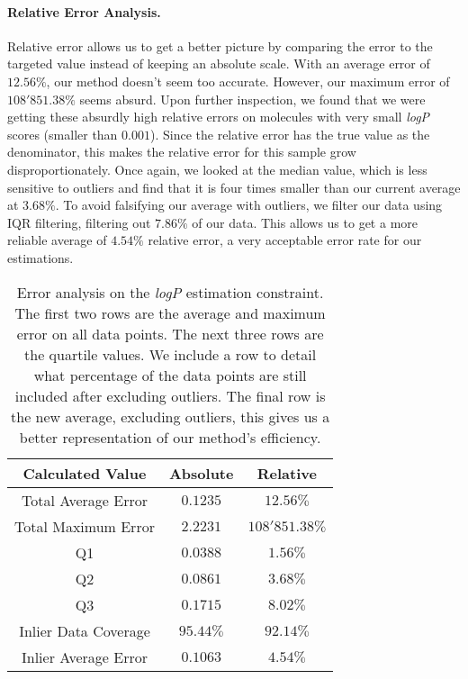 \documentclass[../Document.tex]{subfiles}
\begin{document}
\paragraph{Relative Error Analysis.} Relative error allows us to get a better picture by comparing the error to the targeted value instead of keeping an absolute scale. 
With an average error of $12.56\%$, our method doesn't seem too accurate.
However, our maximum error of $108'851.38\%$ seems absurd.
Upon further inspection, we found that we were getting these absurdly high relative errors on molecules with very small \emph{logP} scores (\ie smaller than $0.001$).
Since the relative error has the true value as the denominator, this makes the relative error for this sample grow disproportionately.
Once again, we looked at the median value, which is less sensitive to outliers and find that it is four times smaller than our current average at $3.68\%$.
To avoid falsifying our average with outliers, we filter our data using IQR filtering, filtering out $7.86\%$ of our data.
This allows us to get a more reliable average of $4.54\%$ relative error, a very acceptable error rate for our estimations.

\begin{table}[H]
    \centering
    \begin{tabular}{|c|c|c|}
        \hline
        Calculated Value & Absolute & Relative\\
        \hline
        Total Average Error & $0.1235$ & $12.56\%$\\
        \hline
        Total Maximum Error & $2.2231$ & $108'851.38\%$\\
        \hline
        Q1 & $0.0388$ & $1.56\%$\\
        \hline
        Q2 & $0.0861$ & $3.68\%$\\
        \hline
        Q3 & $0.1715$ & $8.02\%$\\
        \hline
        Inlier Data Coverage & $95.44\%$ & $92.14\%$\\
        \hline
        Inlier Average Error & $0.1063$ & $4.54\%$\\
        \hline
    \end{tabular}
    \caption[Error analysis on the \emph{logP} estimation constraint]{Error analysis on the \emph{logP} estimation constraint. The first two rows are the average and maximum error on all data points. The next three rows are the quartile values. We include a row to detail what percentage of the data points are still included after excluding outliers. The final row is the new average, excluding outliers, this gives us a better representation of our method's efficiency.}
    \label{tab:lingo-error-analysis}
\end{table}
\end{document}
